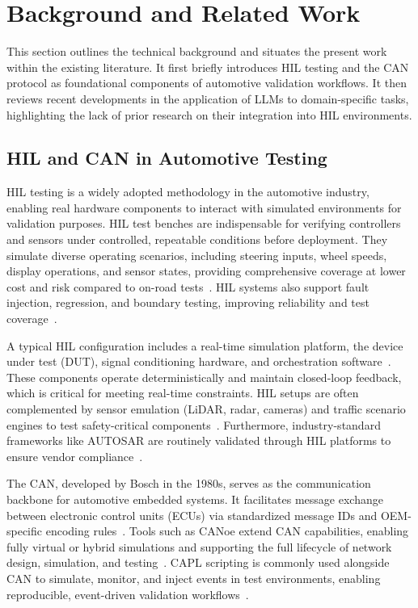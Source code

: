 \documentclass[a4paper,fleqn]{cas-dc}
\begin{document}
\section{Background and Related Work}
\label{sec:related}
This section outlines the technical background and situates the present work within the existing literature. It first briefly introduces HIL testing and the CAN protocol as foundational components of automotive validation workflows. It then reviews recent developments in the application of LLMs to domain-specific tasks, highlighting the lack of prior research on their integration into HIL environments.

\subsection{HIL and CAN in Automotive Testing}
HIL testing is a widely adopted methodology in the automotive industry, enabling real hardware components to interact with simulated environments for validation purposes. HIL test benches are indispensable for verifying controllers and sensors under controlled, repeatable conditions before deployment. They simulate diverse operating scenarios, including steering inputs, wheel speeds, display operations, and sensor states, providing comprehensive coverage at lower cost and risk compared to on-road tests~\cite{garikapati2024dual, cheng2024survey}. HIL systems also support fault injection, regression, and boundary testing, improving reliability and test coverage~\cite{gaspar2024review}.

A typical HIL configuration includes a real-time simulation platform, the device under test (DUT), signal conditioning hardware, and orchestration software~\cite{howick2024framework}. These components operate deterministically and maintain closed-loop feedback, which is critical for meeting real-time constraints. HIL setups are often complemented by sensor emulation (LiDAR, radar, cameras) and traffic scenario engines to test safety-critical components~\cite{jooriah2024co}. Furthermore, industry-standard frameworks like AUTOSAR are routinely validated through HIL platforms to ensure vendor compliance~\cite{kim2024autosar}.

The CAN, developed by Bosch in the 1980s, serves as the communication backbone for automotive embedded systems. It facilitates message exchange between electronic control units (ECUs) via standardized message IDs and OEM-specific encoding rules~\cite{bosch_can20}. Tools such as CANoe extend CAN capabilities, enabling fully virtual or hybrid simulations and supporting the full lifecycle of network design, simulation, and testing~\cite{ali2024efficient, inproceedings}. CAPL scripting is commonly used alongside CAN to simulate, monitor, and inject events in test environments, enabling reproducible, event-driven validation workflows~\cite{vector_capl}.
\end{document}
